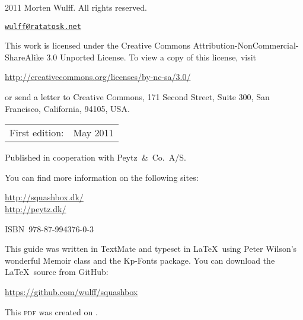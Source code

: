 \begingroup
\footnotesize
\setlength{\parindent}{0pt}
\setlength{\parskip}{\baselineskip}

\textcopyright{} 2011 Morten Wulff. All rights reserved.

\href{mailto:wulff@ratatosk.net}{\texttt{wulff@ratatosk.net}}

\vspace{2\baselineskip}

This work is licensed under the Creative Commons Attribution-NonCom\-mercial-ShareAlike 3.0 Unported License. To view a copy of this license, visit

\url{http://creativecommons.org/licenses/by-nc-sa/3.0/}

or send a letter to Creative Commons, 171 Second Street, Suite 300, San Francisco, California, 94105, USA.

\begin{center}
\begin{tabular}{ll}
First edition: & May 2011 \\
\end{tabular}
\end{center}

Published in cooperation with Peytz~\&~Co.\ A/S.

You can find more information on the following sites:

\url{http://squashbox.dk/} \\
\url{http://peytz.dk/}

\vspace{2\baselineskip}

ISBN~978-87-994376-0-3

\vspace{2\baselineskip}

This guide was written in TextMate and typeset in \LaTeX~using Peter Wilson's wonderful Memoir class and the Kp-Fonts package. You can download the \LaTeX~source from GitHub:

\url{https://github.com/wulff/squashbox}

\vspace{2\baselineskip}

This \textsc{pdf} was created on \thedate.

\endgroup

\thispagestyle{empty}

\clearpage
